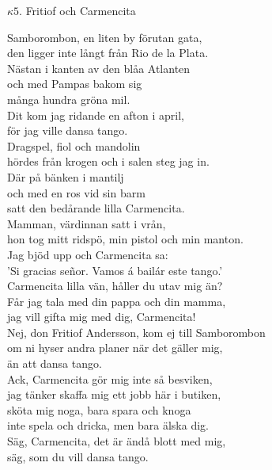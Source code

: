 \documentclass[a6paper,10pt]{article}
\begin{document}
\setlength{\oddsidemargin}{-0.37in}
\noindent
\begin{center}
\Large $\kappa5$. Fritiof och Carmencita \\ 
\end{center}
Samborombon, en liten by förutan gata, \\
den ligger inte långt från Rio de la Plata. \\
Nästan i kanten av den blåa Atlanten \\
och med Pampas bakom sig \\
många hundra gröna mil. \\
Dit kom jag ridande en afton i april, \\
för jag ville dansa tango. 
\vspace{5pt}\\
Dragspel, fiol och mandolin \\
hördes från krogen och i salen steg jag in. \\
Där på bänken i mantilj \\
och med en ros vid sin barm\\
satt den bedårande lilla Carmencita. \\
Mamman, värdinnan satt i vrån, \\
hon tog mitt ridspö, min pistol och min manton. \\
Jag bjöd upp och Carmencita sa: \\
'Si gracias señor. Vamos á bailár este tango.' 
\vspace{5pt}\\
Carmencita lilla vän, håller du utav mig än? \\
Får jag tala med din pappa och din mamma, \\
jag vill gifta mig med dig, Carmencita! \\
Nej, don Fritiof Andersson, kom ej till Samborombon \\
om ni hyser andra planer när det gäller mig, \\
än att dansa tango. 
\vspace{5pt}\\
Ack, Carmencita gör mig inte så besviken, \\
jag tänker skaffa mig ett jobb här i butiken, \\
sköta mig noga, bara spara och knoga \\
inte spela och dricka, men bara älska dig. \\
Säg, Carmencita, det är ändå blott med mig, \\
säg, som du vill dansa tango. 
\end{document}
